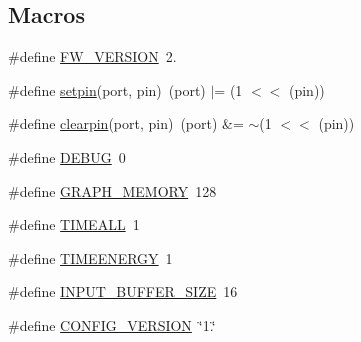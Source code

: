 \subsection*{Macros}
\begin{DoxyCompactItemize}
\item 
\#define \hyperlink{_u_s_b___tester___o_l_e_d__128x64___beta__2_82_8ino_a80bd8a83eaaf4466b44c61321c39b11b}{F\+W\+\_\+\+V\+E\+R\+S\+I\+ON}~2.
\item 
\#define \hyperlink{_u_s_b___tester___o_l_e_d__128x64___beta__2_82_8ino_aad1c2696894438262b4d7527f8e530ff}{setpin}(port,  pin)~(port) $\vert$= (1 $<$$<$ (pin))
\item 
\#define \hyperlink{_u_s_b___tester___o_l_e_d__128x64___beta__2_82_8ino_a14ce0268e28af9c5f9299970dbdd8294}{clearpin}(port,  pin)~(port) \&= $\sim$(1 $<$$<$ (pin))
\item 
\#define \hyperlink{_u_s_b___tester___o_l_e_d__128x64___beta__2_82_8ino_ad72dbcf6d0153db1b8d8a58001feed83}{D\+E\+B\+UG}~0
\item 
\#define \hyperlink{_u_s_b___tester___o_l_e_d__128x64___beta__2_82_8ino_a2c0a8e83033b6e3ab82b31600463e2f8}{G\+R\+A\+P\+H\+\_\+\+M\+E\+M\+O\+RY}~128
\item 
\#define \hyperlink{_u_s_b___tester___o_l_e_d__128x64___beta__2_82_8ino_a4d666fbe756c367955572266cfa87b17}{T\+I\+M\+E\+A\+LL}~1
\item 
\#define \hyperlink{_u_s_b___tester___o_l_e_d__128x64___beta__2_82_8ino_a281f2c9b914d03b3ddcb5cb1326673d3}{T\+I\+M\+E\+E\+N\+E\+R\+GY}~1
\item 
\#define \hyperlink{_u_s_b___tester___o_l_e_d__128x64___beta__2_82_8ino_aa9b8dcc02cea15aab8e3d0b7860327a7}{I\+N\+P\+U\+T\+\_\+\+B\+U\+F\+F\+E\+R\+\_\+\+S\+I\+ZE}~16
\item 
\#define \hyperlink{_u_s_b___tester___o_l_e_d__128x64___beta__2_82_8ino_a33fbd7e91d033fa1e09b4ed4de899c02}{C\+O\+N\+F\+I\+G\+\_\+\+V\+E\+R\+S\+I\+ON}~\char`\"{}1.\char`\"{}
\end{DoxyCompactItemize}
